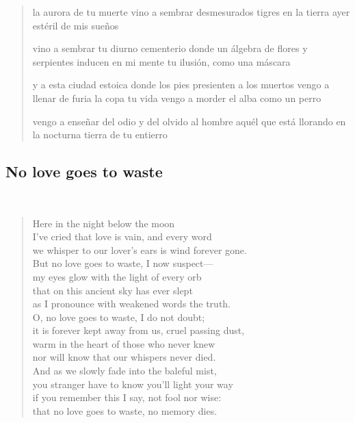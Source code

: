 \documentclass[a4paper, 12pt]{article}
\begin{document}
\begin{verse}
la aurora de tu muerte 
vino a sembrar desmesurados tigres 
en la tierra ayer estéril de mis sueños
~ 

vino a sembrar tu diurno cementerio 
donde un álgebra de flores y serpientes 
inducen en mi mente tu ilusión, como una máscara 
~ 

y a esta ciudad estoica
donde los pies presienten a los muertos 
vengo a llenar de furia la copa tu vida
vengo a morder el alba como un perro 
~ 

vengo a enseñar del odio y del olvido 
al hombre aquél que está llorando 
en la nocturna tierra de tu entierro


\end{verse}

\pagebreak
\subsection{No love goes to waste}
~ 

\begin{verse}
    
Here in the night below the moon\\
I’ve cried that love is vain, and every word\\
we whisper to our lover’s ears is wind forever gone.\\
But no love goes to waste, I now suspect—\\
my eyes glow with the light of every orb\\
that on this ancient sky has ever slept\\
as I pronounce with weakened words the truth.\\
O, no love goes to waste, I do not doubt;\\
it is forever kept away from us, cruel passing dust,\\
warm in the heart of those who never knew\\
nor will know that our whispers never died.\\
And as we slowly fade into the baleful mist,\\
you stranger have to know you’ll light your way\\
if you remember this I say, not fool nor wise:\\
that no love goes to waste, no memory dies.\\
\end{verse}
\end{document}
